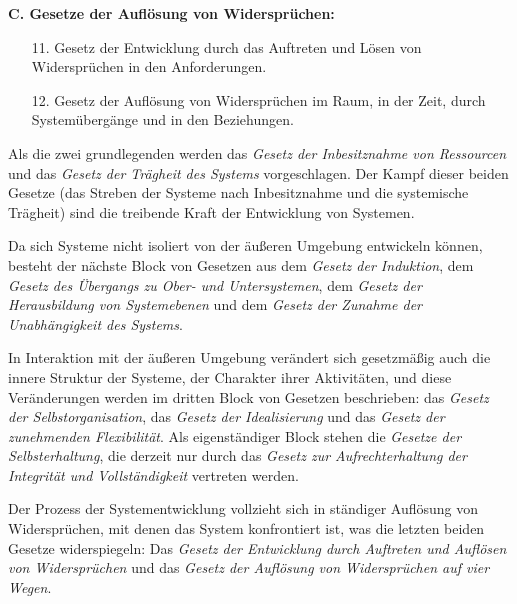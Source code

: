 \documentclass[11pt,a4paper]{article}
\begin{document}
\textbf{C. Gesetze der Auflösung von Widersprüchen:}
\begin{itemize}
\item [11.] Gesetz der Entwicklung durch das Auftreten und Lösen von
  Widersprüchen in den Anforderungen.
\item [12.] Gesetz der Auflösung von Widersprüchen im Raum, in der Zeit,
  durch Systemübergänge und in den Beziehungen.
\end{itemize}

Als die zwei grundlegenden werden das \emph{Gesetz der Inbesitznahme von
  Ressourcen} und das \emph{Gesetz der Trägheit des Systems} vorgeschlagen.
Der Kampf dieser beiden Gesetze (das Streben der Systeme nach Inbesitznahme
und die systemische Trägheit) sind die treibende Kraft der Entwicklung von
Systemen.

Da sich Systeme nicht isoliert von der äußeren Umgebung entwickeln können,
besteht der nächste Block von Gesetzen aus dem \emph{Gesetz der Induktion},
dem \emph{Gesetz des Übergangs zu Ober- und Untersystemen}, dem \emph{Gesetz
  der Herausbildung von Systemebenen} und dem \emph{Gesetz der Zunahme der
  Unabhängigkeit des Systems}.

In Interaktion mit der äußeren Umgebung verändert sich gesetzmäßig auch die
innere Struktur der Systeme, der Charakter ihrer Aktivitäten, und diese
Veränderungen werden im dritten Block von Gesetzen beschrieben: das
\emph{Gesetz der Selbstorganisation}, das \emph{Gesetz der Idealisierung} und
das \emph{Gesetz der zunehmenden Flexibilität}.  Als eigenständiger Block
stehen die \emph{Gesetze der Selbsterhaltung}, die derzeit nur durch das
\emph{Gesetz zur Aufrechterhaltung der Integrität und Vollständigkeit}
vertreten werden.

Der Prozess der Systementwicklung vollzieht sich in ständiger Auflösung von
Widersprüchen, mit denen das System konfrontiert ist, was die letzten beiden
Gesetze widerspiegeln: Das \emph{Gesetz der Entwicklung durch Auftreten und
  Auflösen von Widersprüchen} und das \emph{Gesetz der Auflösung von
  Widersprüchen auf vier Wegen}.
\end{document}

